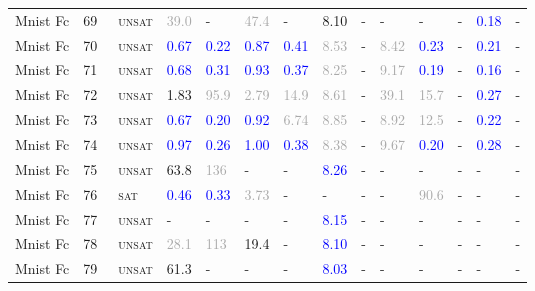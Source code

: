 \begin{center}
{\begin{longtable}{@{}llllllllllllll@{}}
Mnist Fc & 69 & ~\textsc{unsat} & \textcolor{darkgray}{39.0} & - & \textcolor{darkgray}{47.4} & - & \textcolor{second}{8.10} & - & - & - & - & \textcolor{blue}{0.18} & - \\
Mnist Fc & 70 & ~\textsc{unsat} & \textcolor{blue}{0.67} & \textcolor{blue}{0.22} & \textcolor{blue}{0.87} & \textcolor{blue}{0.41} & \textcolor{darkgray}{8.53} & - & \textcolor{darkgray}{8.42} & \textcolor{blue}{0.23} & - & \textcolor{blue}{0.21} & - \\
Mnist Fc & 71 & ~\textsc{unsat} & \textcolor{blue}{0.68} & \textcolor{blue}{0.31} & \textcolor{blue}{0.93} & \textcolor{blue}{0.37} & \textcolor{darkgray}{8.25} & - & \textcolor{darkgray}{9.17} & \textcolor{blue}{0.19} & - & \textcolor{blue}{0.16} & - \\
Mnist Fc & 72 & ~\textsc{unsat} & \textcolor{second}{1.83} & \textcolor{darkgray}{95.9} & \textcolor{darkgray}{2.79} & \textcolor{darkgray}{14.9} & \textcolor{darkgray}{8.61} & - & \textcolor{darkgray}{39.1} & \textcolor{darkgray}{15.7} & - & \textcolor{blue}{0.27} & - \\
Mnist Fc & 73 & ~\textsc{unsat} & \textcolor{blue}{0.67} & \textcolor{blue}{0.20} & \textcolor{blue}{0.92} & \textcolor{darkgray}{6.74} & \textcolor{darkgray}{8.85} & - & \textcolor{darkgray}{8.92} & \textcolor{darkgray}{12.5} & - & \textcolor{blue}{0.22} & - \\
Mnist Fc & 74 & ~\textsc{unsat} & \textcolor{blue}{0.97} & \textcolor{blue}{0.26} & \textcolor{blue}{1.00} & \textcolor{blue}{0.38} & \textcolor{darkgray}{8.38} & - & \textcolor{darkgray}{9.67} & \textcolor{blue}{0.20} & - & \textcolor{blue}{0.28} & - \\
Mnist Fc & 75 & ~\textsc{unsat} & \textcolor{second}{63.8} & \textcolor{darkgray}{136} & - & - & \textcolor{blue}{8.26} & - & - & - & - & - & - \\
Mnist Fc & 76 & ~\textsc{sat} & \textcolor{blue}{0.46} & \textcolor{blue}{0.33} & \textcolor{darkgray}{3.73} & - & - & - & - & \textcolor{darkgray}{90.6} & - & - & - \\
Mnist Fc & 77 & ~\textsc{unsat} & - & - & - & - & \textcolor{blue}{8.15} & - & - & - & - & - & - \\
Mnist Fc & 78 & ~\textsc{unsat} & \textcolor{darkgray}{28.1} & \textcolor{darkgray}{113} & \textcolor{second}{19.4} & - & \textcolor{blue}{8.10} & - & - & - & - & - & - \\
Mnist Fc & 79 & ~\textsc{unsat} & \textcolor{second}{61.3} & - & - & - & \textcolor{blue}{8.03} & - & - & - & - & - & - \\

\end{longtable}}
\end{center}
